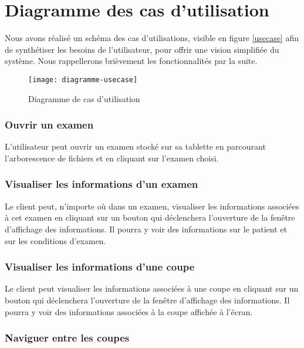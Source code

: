 \section{Diagramme des cas d'utilisation}

Nous avons réalisé un schéma des cas d'utilisations, visible en figure \vref{usecase} afin de synthétiser les besoins de l'utilisateur, pour offrir une vision simplifiée du système. Nous rappellerons brièvement les fonctionnalités par la suite.

\begin{figure}[h]
\begin{center}
    \texttt{[image: diagramme-usecase]}
\end{center}
    \caption{Diagramme de cas d'utilisation}
    \label{usecase}                      
\end{figure}

\subsubsection{Ouvrir un examen}

L'utilisateur peut ouvrir un examen stocké sur sa tablette en parcourant l'arborescence de fichiers
et en cliquant sur l'examen choisi.

\subsubsection{Visualiser les informations d'un examen}

Le client peut, n'importe où dans un examen, visualiser les informations associées à cet examen
en cliquant sur un bouton qui déclenchera l'ouverture de la fenêtre d'affichage des informations.
Il pourra y voir des informations sur le patient et sur les conditions d'examen.

\subsubsection{Visualiser les informations d'une coupe}

Le client peut visualiser les informations associées à une coupe
en cliquant sur un bouton qui déclenchera l'ouverture de la fenêtre d'affichage des informations.
Il pourra y voir des informations associées à la coupe affichée à l'écran.

\subsubsection{Naviguer entre les coupes}

